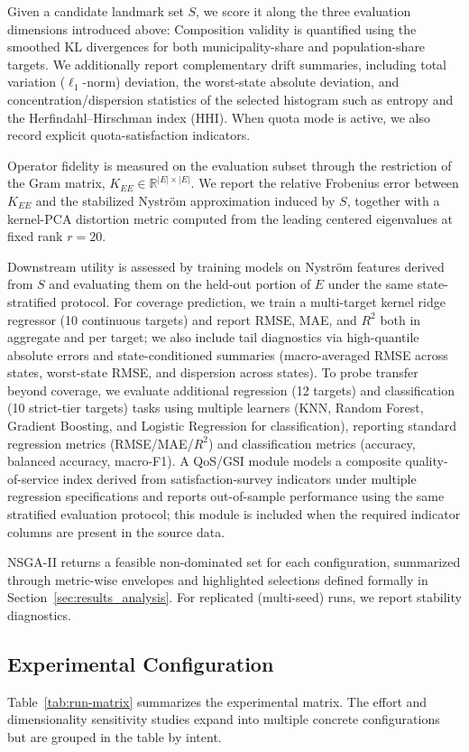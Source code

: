 \documentclass[10pt,journal]{IEEEtran}
\newcommand{\R}{\mathbb{R}}
\newcommand{\1}{\mathbf{1}}
\theoremstyle{ieeethm}
\begin{document}
Given a candidate landmark set $S$, we score it along the three evaluation dimensions
introduced above: Composition validity is quantified using
the smoothed KL divergences for both municipality-share and population-share targets. We additionally report
complementary drift summaries, including total variation ($\ell_1$-norm) deviation, the worst-state absolute
deviation, and concentration/dispersion statistics of the selected histogram such as entropy and the
Herfindahl--Hirschman index (HHI). When quota mode is active, we also record explicit quota-satisfaction indicators.

Operator fidelity is measured on the evaluation subset through the restriction of the Gram matrix,
$K_{EE}\in\R^{|E|\times|E|}$. We report the relative Frobenius error between $K_{EE}$ and the stabilized Nyström
approximation induced by $S$, together with a kernel-PCA distortion metric computed from the leading centered
eigenvalues at fixed rank $r=20$.

Downstream utility is assessed by training models on Nyström features derived from $S$ and evaluating them on the
held-out portion of $E$ under the same state-stratified protocol. For coverage prediction, we train a multi-target
kernel ridge regressor (10 continuous targets) and report RMSE, MAE, and $R^2$ both in aggregate and per target;
we also include tail diagnostics via high-quantile absolute errors and state-conditioned summaries (macro-averaged
RMSE across states, worst-state RMSE, and dispersion across states). To probe transfer beyond coverage, we evaluate
additional regression (12 targets) and classification (10 strict-tier targets) tasks using multiple learners
(KNN, Random Forest, Gradient Boosting, and Logistic Regression for classification), reporting standard regression
metrics (RMSE/MAE/$R^2$) and classification metrics (accuracy, balanced accuracy, macro-F1). A QoS/GSI module models a composite quality-of-service index derived from satisfaction-survey
indicators under multiple regression specifications and reports out-of-sample performance using
the same stratified evaluation protocol; this module is included when the required indicator
columns are present in the source data.

NSGA-II returns a feasible non-dominated set for each configuration, summarized through
metric-wise envelopes and highlighted selections defined formally in
Section~\ref{sec:results_analysis}. For replicated (multi-seed) runs, we report stability
diagnostics.

\subsection{Experimental Configuration}
Table~\ref{tab:run-matrix} summarizes the experimental matrix. The effort and dimensionality sensitivity studies expand into multiple concrete configurations but are grouped in the table by intent.
\end{document}
